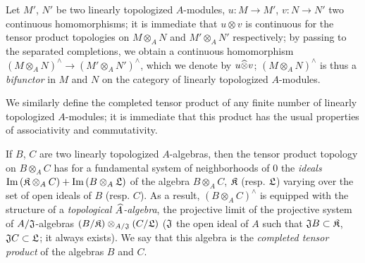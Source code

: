 \begin{env}[7.7.3]
\label{0.7.7.3}
Let $M'$, $N'$ be two linearly topologized $A$-modules, $u:M\to M'$, $v:N\to N'$ two continuous
homomorphisms; it is immediate that $u\otimes v$ is continuous for the tensor product topologies on
$M\otimes_A N$ and $M'\otimes_A N'$ respectively; by passing to the separated completions, we obtain
a continuous homomorphism $(M\otimes_A N)^\wedge\to(M'\otimes_A N')^\wedge$, which we denote by
$u\widehat{\otimes}v$; $(M\otimes_A N)^\wedge$ is thus a \emph{bifunctor} in $M$ and $N$ on the category
of linearly topologized $A$-modules.
\end{env}

\begin{env}[7.7.4]
\label{0.7.7.4}
We similarly define the completed tensor product of any finite number of linearly topologized
$A$-modules; it is immediate that this product has the usual properties of associativity and
commutativity.
\end{env}

\begin{env}[7.7.5]
\label{0.7.5.5}
If $B$, $C$ are two linearly topologized $A$-algebras, then the tensor product topology on
$B\otimes_A C$ has for a fundamental system of neighborhoods of $0$ the \emph{ideals}
${\mathop{\mathrm{Im}}\nolimits}\,(\mathfrak{K}\otimes_A C)+{\mathop{\mathrm{Im}}\nolimits}\,(B\otimes_A\mathfrak{L})$ of the algebra $B\otimes_A C$,
$\mathfrak{K}$ (resp. $\mathfrak{L}$) varying over the set of open ideals of $B$ (resp. $C$).
As a result, $(B\otimes_A C)^\wedge$ is equipped with the structure of a \emph{topological
$\widehat{A}$-algebra}, the projective limit of the projective system of $A/\mathfrak{J}$-algebras
$(B/\mathfrak{K})\otimes_{A/\mathfrak{J}}(C/\mathfrak{L})$ ($\mathfrak{J}$ the open ideal of $A$
such that $\mathfrak{J}B\subset\mathfrak{K}$, $\mathfrak{J}C\subset\mathfrak{L}$; it always exists).
We say that this algebra is the \emph{completed tensor product} of the algebras $B$ and $C$.
\end{env}

